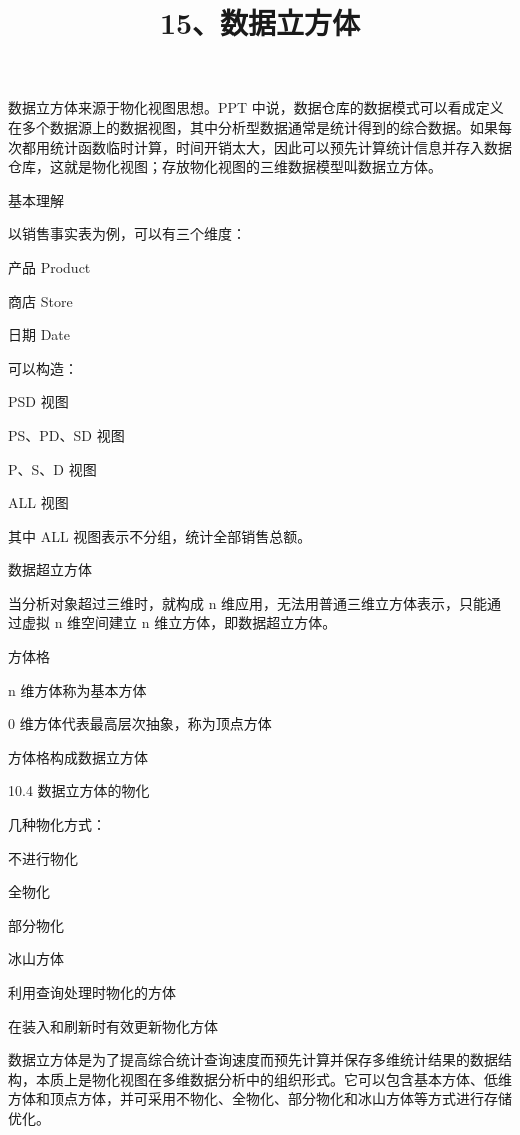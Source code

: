 \documentclass[UTF8,zihao=-4]{ctexart}
\begin{document}
\title{15、数据立方体}
\author{}
\date{}
\maketitle

数据立方体来源于物化视图思想。PPT 中说，数据仓库的数据模式可以看成定义在多个数据源上的数据视图，其中分析型数据通常是统计得到的综合数据。如果每次都用统计函数临时计算，时间开销太大，因此可以预先计算统计信息并存入数据仓库，这就是物化视图；存放物化视图的三维数据模型叫数据立方体。\par

基本理解\par

以销售事实表为例，可以有三个维度：\par

产品 Product\par
商店 Store\par
日期 Date\par

可以构造：\par

PSD 视图\par
PS、PD、SD 视图\par
P、S、D 视图\par
ALL 视图\par

其中 ALL 视图表示不分组，统计全部销售总额。\par

数据超立方体\par

当分析对象超过三维时，就构成 n 维应用，无法用普通三维立方体表示，只能通过虚拟 n 维空间建立 n 维立方体，即数据超立方体。\par

方体格\par

n 维方体称为基本方体\par
0 维方体代表最高层次抽象，称为顶点方体\par
方体格构成数据立方体\par
10.4 数据立方体的物化\par

几种物化方式：\par

不进行物化\par
全物化\par
部分物化\par
冰山方体\par
利用查询处理时物化的方体\par
在装入和刷新时有效更新物化方体\par

数据立方体是为了提高综合统计查询速度而预先计算并保存多维统计结果的数据结构，本质上是物化视图在多维数据分析中的组织形式。它可以包含基本方体、低维方体和顶点方体，并可采用不物化、全物化、部分物化和冰山方体等方式进行存储优化。\par
\end{document}
